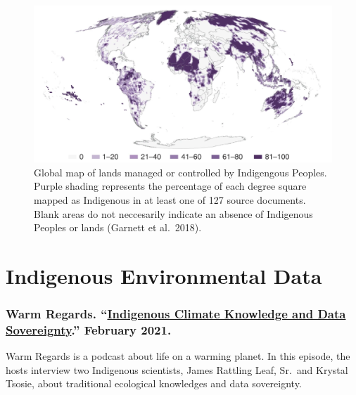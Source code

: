 \documentclass[
]{book}
\begin{document}
\begin{figure}
\centering
\includegraphics{images/Garnett_2018.png}
\caption{\label{fig:unnamed-chunk-7}Global map of lands managed or controlled by Indigengous Peoples. Purple shading represents the percentage of each degree square mapped as Indigenous in at least one of 127 source documents. Blank areas do not neccesarily indicate an absence of Indigenous Peoples or lands (Garnett et al.~2018).}
\end{figure}

\hypertarget{indigenous-environmental-data}{%
\section{Indigenous Environmental Data}\label{indigenous-environmental-data}}

\hypertarget{warm-regards.-indigenous-climate-knowledge-and-data-sovereignty.-february-2021.}{%
\subsubsection*{\texorpdfstring{Warm Regards. ``\href{https://open.spotify.com/episode/4Gdp1RSChCPM0qftRun3DD?si=pcVeYiwwQIWnlKynt4-ADQ}{Indigenous Climate Knowledge and Data Sovereignty}.'' February 2021.}{Warm Regards. ``Indigenous Climate Knowledge and Data Sovereignty.'' February 2021.}}\label{warm-regards.-indigenous-climate-knowledge-and-data-sovereignty.-february-2021.}}

Warm Regards is a podcast about life on a warming planet. In this episode, the hosts interview two Indigenous scientists, James Rattling Leaf, Sr.~and Krystal Tsosie, about traditional ecological knowledges and data sovereignty.
\end{document}
